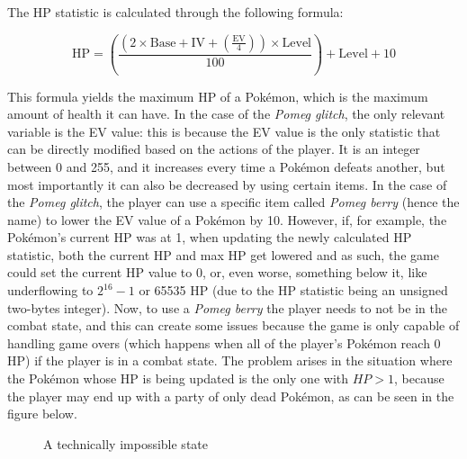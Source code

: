 \documentclass[a4paper]{usiinfbachelorproject}
\begin{document}
The HP statistic is calculated through the following formula:

\begin{equation}
	\text{HP} = \left( \frac{(2 \times \text{Base} + \text{IV} + \left( \frac{\text{EV}}{4} \right)) \times \text{Level}}{100} \right) + \text{Level} + 10
	\label{eq:pokemon_hp_formula}
\end{equation}

This formula yields the maximum HP of a Pokémon, which is the maximum amount of health it can have. In the case of the \textit{Pomeg glitch}, the only relevant variable is the EV value: this is because the EV value is the only statistic that can be directly modified based on the actions of the player. It is an integer between 0 and 255, and it increases every time a Pokémon defeats another, but most importantly it can also be decreased by using certain items. In the case of the \textit{Pomeg glitch}, the player can use a specific item called \textit{Pomeg berry} (hence the name) to lower the EV value of a Pokémon by 10. However, if, for example, the Pokémon's current HP was at 1, when updating the newly calculated HP statistic, both the current HP and max HP get lowered and as such, the game could set the current HP value to 0, or, even worse, something below it, like underflowing to $ 2^{16}-1$ or 65535 HP (due to the HP statistic being an unsigned two-bytes integer). Now, to use a \textit{Pomeg berry} the player needs to not be in the combat state, and this can create some issues because the game is only capable of handling game overs (which happens when all of the player's Pokémon reach 0 HP) if the player is in a combat state. The problem arises in the situation where the Pokémon whose HP is being updated is the only one with $HP > 1$, because the player may end up with a party of only dead Pokémon, as can be seen in the figure below.

\begin{figure}[h!]
	\caption{A technically impossible state}\label{fig:dead_team}
\end{figure}
\end{document}
